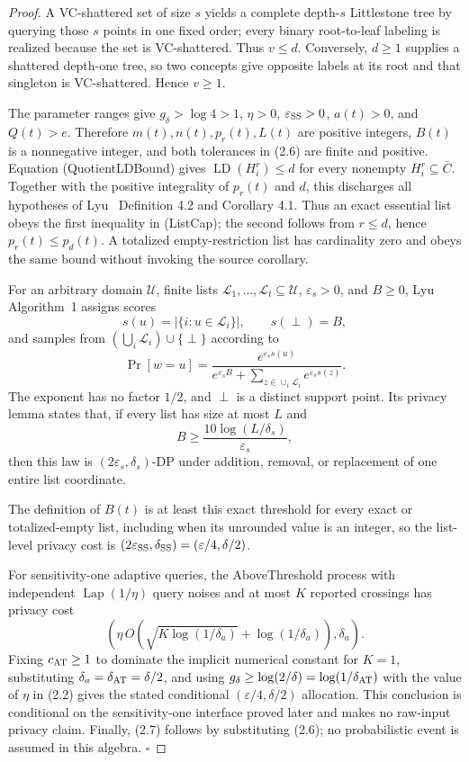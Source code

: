 \begin{proof}
A VC-shattered set of size \(s\) yields a complete depth-\(s\)
Littlestone tree by querying those \(s\) points in one fixed order; every
binary root-to-leaf labeling is realized because the set is VC-shattered.
Thus \(v\le d\). Conversely, \(d\ge1\) supplies a shattered depth-one tree,
so two concepts give opposite labels at its root and that singleton is
VC-shattered. Hence \(v\ge1\).

The parameter ranges give \(g_\delta>\log4>1\), \(\eta>0\),
\(\varepsilon_{\rm SS}>0\), \(a(t)>0\), and \(Q(t)>e\). Therefore
\(m(t),n(t),p_r(t),L(t)\) are positive integers, \(B(t)\) is a nonnegative
integer, and both tolerances in (2.6) are finite and positive. Equation
(QuotientLDBound) gives
\(\operatorname{LD}(H_i^r)\le d\) for every nonempty
\(H_i^r\subseteq\bar C\). Together with the positive integrality of
\(p_r(t)\) and \(d\), this discharges all hypotheses of Lyu~\citep{lyu2025} Definition 4.2
and Corollary 4.1. Thus an exact essential list obeys the first inequality
in (ListCap); the second follows from \(r\le d\), hence
\(p_r(t)\le p_d(t)\). A totalized empty-restriction list has cardinality zero
and obeys the same bound without invoking the source corollary.

For an arbitrary domain \(\mathcal U\), finite lists
\(\mathcal L_1,\ldots,\mathcal L_t\subseteq\mathcal U\),
\(\varepsilon_s>0\), and \(B\ge0\), Lyu~\citep{lyu2025} Algorithm~1
assigns scores
\[
s(u)=|\{i:u\in\mathcal L_i\}|,
\qquad s(\perp)=B,
\]
and samples from \((\bigcup_i\mathcal L_i)\cup\{\perp\}\) according to
\[
\Pr[w=u]
=\frac{e^{\varepsilon_s s(u)}}
{e^{\varepsilon_s B}+
  \sum_{z\in\cup_i\mathcal L_i}e^{\varepsilon_s s(z)}}.
\tag{SparseLaw}
\]
The exponent has no factor \(1/2\), and \(\perp\) is a distinct support
point. Its privacy lemma states that, if every list has size at most
\(L\) and
\[
B\ge \frac{10\log(L/\delta_s)}{\varepsilon_s},
\tag{SparsePrivacyThreshold}
\]
then this law is \((2\varepsilon_s,\delta_s)\)-DP under addition, removal,
or replacement of one entire list coordinate.

The definition of \(B(t)\) is at least this exact threshold for every exact
or totalized-empty list, including when its unrounded value is an integer, so
the list-level privacy cost is
\((2\varepsilon_{\rm SS},\delta_{\rm SS})
=(\varepsilon/4,\delta/2)\).

For sensitivity-one adaptive queries, the AboveThreshold process
with independent \(\operatorname{Lap}(1/\eta)\) query noises and at most
\(K\) reported crossings has privacy cost
\[
\left(
\eta\,O\!\left(\sqrt{K\log(1/\delta_a)}
     +\log(1/\delta_a)\right),\delta_a
\right).
\tag{ATPrivacy}
\]
Fixing \(c_{\rm AT}\ge1\) to dominate the implicit numerical constant for
\(K=1\), substituting \(\delta_a=\delta_{\rm AT}=\delta/2\), and using
\(g_\delta\ge\log(2/\delta)=\log(1/\delta_{\rm AT})\) with the value of
\(\eta\) in (2.2) gives the stated conditional
\((\varepsilon/4,\delta/2)\) allocation. This conclusion is conditional on
the sensitivity-one interface proved later and makes no raw-input privacy
claim. Finally, (2.7) follows by substituting (2.6); no probabilistic event
is assumed in this algebra. \(\square\)



\end{proof}
